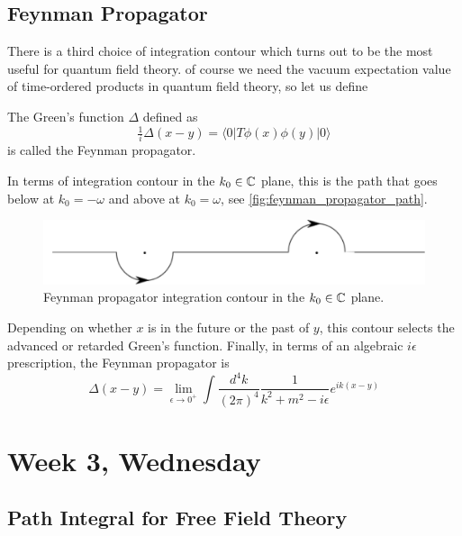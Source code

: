 \documentclass[12pt]{article}
\begin{document}
\subsection{Feynman Propagator}

There is a third choice of integration contour which turns out to be
the most useful for quantum field theory. of course we need the vacuum
expectation value of time-ordered products in quantum field theory, so
let us define
\begin{definition}
  The Green's function $\Delta$ defined as 
  \begin{equation}
    \tfrac{1}{i} \Delta(x-y) = 
    \langle 0 | T \phi(x) \phi(y) |0\rangle
  \end{equation}
  is called the Feynman propagator.
\end{definition}
In terms of integration contour in the $k_0\in {\mathbb{C}}$ plane, this is the
path that goes below at $k_0=-\omega$ and above at $k_0=\omega$, see
\autoref{fig:feynman_propagator_path}. 
\begin{figure}
  \label{fig:feynman_propagator_path}
  \centering
  \includegraphics[width=\linewidth]{figures/FeynmanPropagatorPath.pdf}
  \caption{Feynman propagator integration contour in the $k_0\in {\mathbb{C}}$ plane.}
\end{figure}
Depending on whether $x$ is in the future or the past of $y$, this
contour selects the advanced or retarded Green's function. Finally, in
terms of an algebraic $i\epsilon$ prescription, the Feynman propagator
is
\begin{equation}
  \Delta(x-y) = 
  \lim_{\epsilon \to 0^+}
  \int
  \frac{d^4k}{(2\pi)^4}
  \frac{1}{k^2 + m^2 - i \epsilon}
  e^{ik(x-y)}
\end{equation}




\section{Week 3, Wednesday}

\subsection{Path Integral for Free Field Theory}
\end{document}
